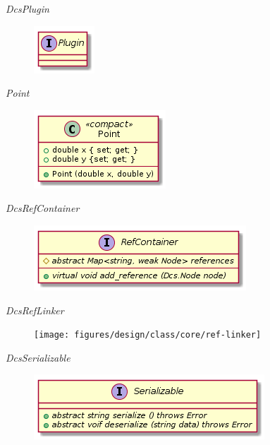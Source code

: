       \emph{DcsPlugin}

        \begin{figure}[H]
          \includegraphics{figures/design/class/core/plugin}
        \end{figure}

      \emph{Point}

        \begin{figure}[H]
          \includegraphics{figures/design/class/core/point}
        \end{figure}

      \emph{DcsRefContainer}

        \begin{figure}[H]
          \includegraphics{figures/design/class/core/ref-container}
        \end{figure}

      \emph{DcsRefLinker}

        \begin{figure}[H]
          \texttt{[image: figures/design/class/core/ref-linker]}
        \end{figure}

      \emph{DcsSerializable}

        \begin{figure}[H]
          \includegraphics{figures/design/class/core/serializable}
        \end{figure}

